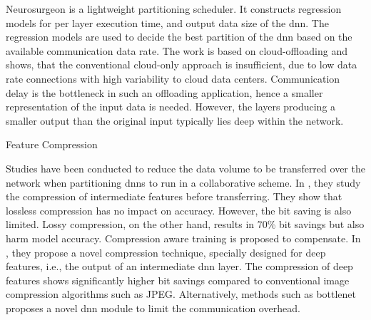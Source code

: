 Neurosurgeon \cite{kang_neurosurgeon:_2017} is a lightweight partitioning scheduler. It constructs regression models for per layer execution time, and output data size of the \gls{dnn}. The regression models are used to decide the best partition of the \gls{dnn} based on the available communication data rate. The work is based on cloud-offloading and shows, that the conventional cloud-only approach is insufficient, due to low data rate connections with high variability to cloud data centers. Communication delay is the bottleneck in such an offloading application, hence a smaller representation of the input data is needed. However, the layers producing a smaller output than the original input typically lies deep within the network.
\begin{enumdescript}
	\item[Feature Compression] 
	
	Studies have been conducted to reduce the data volume to be transferred over the network when partitioning \gls{dnn}s to run in a collaborative scheme.  In \cite{choi_deep_2018}, they study the compression of intermediate features before transferring. They show that lossless compression has no impact on accuracy. However, the bit saving is also limited. Lossy compression, on the other hand, results in 70\% bit savings but also harm model accuracy. Compression aware training is proposed to compensate. In \cite{choi_near-lossless_2018}, they propose a novel compression technique, specially designed for deep features, i.e., the output of an intermediate \gls{dnn} layer. The compression of deep features shows significantly higher bit savings compared to conventional image compression algorithms such as JPEG. Alternatively, methods such as \gls{bottlenet} \cite{eshratifar_bottlenet:_2019}  proposes a novel \gls{dnn} module to limit the communication overhead.
	
	
	

\end{enumdescript}

